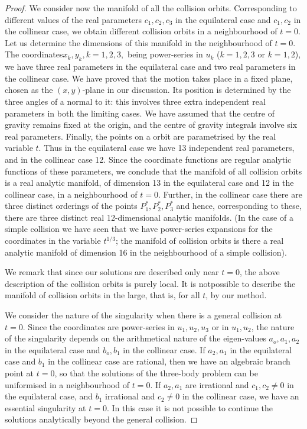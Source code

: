 \begin{proof}
We consider now the manifold of all the collision
orbits. Corresponding to different values of the real parameters $c_1,
c_2, c_3$ in the equilateral case and $c_1, c_2$ in the collinear
case, we obtain different collision orbits in a neighbourhood of $t
=0$. Let us determine the dimensions of this manifold in the
neighbourhood of $t=0$. The coordinates\pageoriginale $x_k, y_k, k
=1,2,3,$ being power-series in $u_k$ ($k=1,2,3$ or $k=1,2$), we have
three real parameters in the equilateral case and two real parameters
in the collinear case. We have proved that the motion takes place in a
fixed plane, chosen as the $(x,y)$-plane in our discussion. Its
position is determined by the three angles of a normal to it: this
involves three extra independent real parameters in both the limiting
cases. We have assumed that the centre of gravity remains fixed at the
origin, and the centre of gravity integrals involve six real
parameters. Finally, the points on a orbit are parametrised by the
real variable $t$. Thus in the equilateral case we have 13 independent
real parameters, and in the collinear case 12. Since the coordinate
functions are regular analytic functions of these parameters, we
conclude that the manifold of all collision orbits is a real analytic
manifold, of dimension 13 in the equilateral case and 12 in the
collinear case, in a neighbourhood of $t =0$. Further, in the
collinear case there are three distinct orderings of the points
$P^*_1, P^*_2, P^*_3$ and hence, corresponding to these, there are
three distinct real 12-dimensional analytic manifolds. (In the case of
a simple collision we have seen that we have power-series expansions
for the coordinates in the variable $t^{1/3}$; the manifold of
collision orbits is there a real analytic manifold of dimension 16 in
the neighbourhood of a simple collision). 

We remark that since our solutions are described only near $t  =0$,
the above description of the collision orbits is purely local. It is
not\pageoriginale possible to describe the manifold of collision
orbits in the large, that is, for all $t$, by our method. 

We consider the nature of the singularity when there is a general
collision at $t=0$. Since the coordinates are power-series in $u_1,
u_2, u_3$ or in $u_1, u_2$, the nature of the singularity depends on
the arithmetical nature of the eigen-values $a_o, a_1, a_2$ in the
equilateral case and $b_o, b_1$ in the collinear case. If $a_2, a_1$
in the equilateral case and $b_1$ in the collinear case are rational,
then we have an algebraic branch point at $t = 0$, so that the
solutions of the three-body problem can be uniformised in a
neighbourhood of $t=0$. If $a_2, a_1$ are irrational and $c_1, c_2
\neq 0$ in the equilateral case, and $b_1$ irrational and $c_2 \neq 0$
in the collinear case, we have an essential singularity at $t = 0$. In
this case it is not possible to continue the solutions analytically
beyond the general collision. 

\end{proof}
